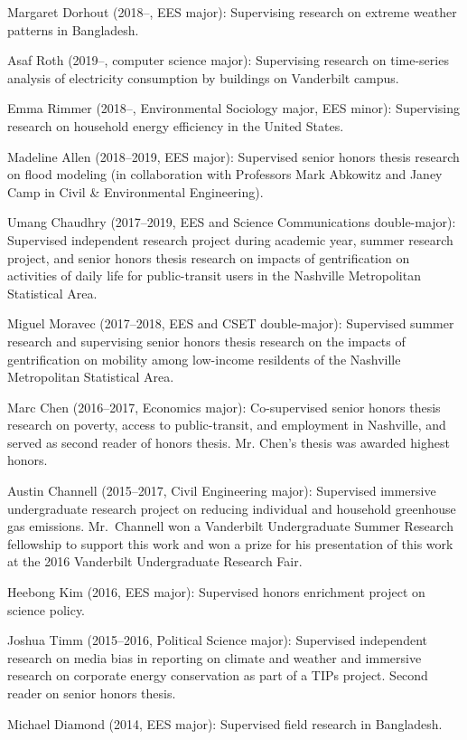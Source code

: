 \item Margaret Dorhout (2018--, EES major): Supervising research on extreme weather patterns in Bangladesh.
\item Asaf Roth (2019--, computer science major): Supervising research on time-series analysis of electricity consumption by buildings on Vanderbilt campus.
\item Emma Rimmer (2018--, Environmental Sociology major, EES minor): Supervising research on household energy efficiency in the United States.
\item Madeline Allen (2018--2019, EES major): Supervised senior honors thesis research on flood modeling (in collaboration with Professors Mark Abkowitz and Janey Camp in Civil \& Environmental Engineering).
\item Umang Chaudhry (2017--2019, EES and Science Communications double-major): Supervised independent research project during academic year, summer research project, and senior honors thesis research on impacts of gentrification on activities of daily life
for public-transit users in the Nashville Metropolitan Statistical Area.
\item Miguel Moravec (2017--2018, EES and CSET double-major): Supervised summer research and supervising senior honors thesis research on the impacts of gentrification on mobility among low-income resildents of the Nashville Metropolitan Statistical Area.
\item Marc Chen (2016--2017, Economics major): Co-supervised senior honors thesis research on poverty, access to public-transit, and employment in Nashville, and served as second reader of honors thesis. Mr. Chen's thesis was awarded highest honors.
\item Austin Channell (2015--2017, Civil Engineering major): Supervised immersive undergraduate research project on reducing individual and household greenhouse gas emissions.
Mr.~Channell won a Vanderbilt Undergraduate Summer Research fellowship to support this work and won a prize for his presentation of this work at the 2016 Vanderbilt Undergraduate Research Fair.
\item Heebong Kim (2016, EES major): Supervised honors enrichment project on science policy.
\item Joshua Timm (2015--2016, Political Science major): Supervised independent research on media bias in reporting on climate and weather and immersive research on corporate energy conservation as part of a TIPs project. Second reader on senior honors thesis.
\item Michael Diamond (2014, EES major): Supervised field research in Bangladesh.
